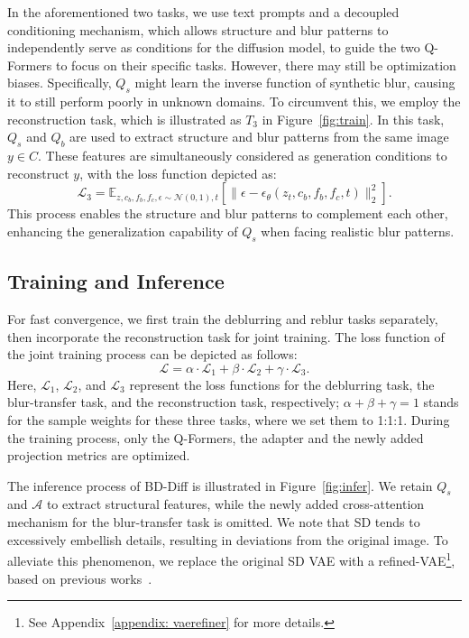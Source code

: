 In the aforementioned two tasks, we use text prompts and a decoupled conditioning mechanism, which allows structure and blur patterns to independently serve as conditions for the diffusion model, to guide the two Q-Formers to focus on their specific tasks. However, there may still be optimization biases. Specifically, $Q_s$ might learn the inverse function of synthetic blur, causing it to still perform poorly in unknown domains. To circumvent this, we employ the reconstruction task, which is illustrated as $T_3$ in Figure~\ref{fig:train}. In this task, $Q_s$ and $Q_b$ are used to extract structure and blur patterns from the same image $y \in C$. These features are simultaneously considered as generation conditions to reconstruct $y$, with the loss function depicted as:
\begin{equation}
\label{eq:loss3}
\mathcal{L}_3 = 
\mathbb{E}_{z,c_b,f_b,f_c,\epsilon \sim \mathcal{N}(0,1),t} \left[ \| \epsilon - \epsilon_\theta (z_t, c_b, f_b,f_c, t) \|_2^2 \right].
\end{equation}
This process enables the structure and blur patterns to complement each other, enhancing the generalization capability of $Q_s$ when facing realistic blur patterns.

\subsection{Training and Inference}
\label{sec:inference}

For fast convergence, we first train the deblurring and reblur tasks separately, then incorporate the reconstruction task for joint training. The loss function of the joint training process can be depicted as follows:
\begin{equation}
\label{eq:our loss}
\mathcal{L} = \alpha  \cdot \mathcal{L}_1 + \beta \cdot \mathcal{L}_2 + \gamma \cdot \mathcal{L}_3.
\end{equation}
Here, $\mathcal{L}_1$, $\mathcal{L}_2$, and $\mathcal{L}_3$ represent the loss functions for the deblurring task, the blur-transfer task, and the reconstruction task, respectively; $\alpha + \beta + \gamma = 1$ stands for the sample weights for these three tasks, where we set them to 1:1:1. During the training process, only the Q-Formers, the adapter and the newly added projection metrics are optimized. 

The inference process of BD-Diff is illustrated in Figure~\ref{fig:infer}. We retain $Q_s$ and $\mathcal{A}$ to extract structural features, while the newly added cross-attention mechanism for the blur-transfer task is omitted. We note that SD tends to excessively embellish details, resulting in deviations from the original image. To alleviate this phenomenon, we replace the original SD VAE with a refined-VAE\footnote{See Appendix~\ref{appendix: vaerefiner} for more details.}, based on previous works~\cite{chen2025unirestore,zhang2024diff}.


